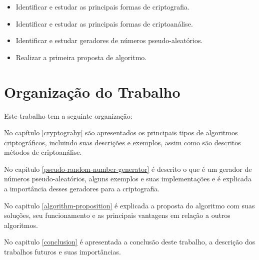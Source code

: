 \begin{itemize}
	\item Identificar e estudar as principais formas de criptografia.
	\item Identificar e estudar as principais formas de criptoanálise.
	\item Identificar e estudar geradores de números pseudo-aleatórios.
	\item Realizar a primeira proposta de algoritmo.
\end{itemize}

\section{Organização do Trabalho}
\label{paper-organization}

Este trabalho tem a seguinte organização:

No capítulo \ref{cryptograhy} são apresentados os principais tipos de algoritmos criptográficos, incluindo suas descrições e exemplos, assim como são descritos métodos de criptoanálise.

No capitulo \ref{pseudo-random-number-generator} é descrito o que é um gerador de números pseudo-aleatórios, alguns exemplos e suas implementações e é explicada a importância desses geradores para a criptografia. 

No capitulo \ref{algorithm-proposition} é explicada a proposta do algoritmo com suas soluções, seu funcionamento e as principais vantagens em relação a outros algoritmos.

No capitulo \ref{conclusion} é apresentada a conclusão deste trabalho, a descrição dos trabalhos futuros e suas importâncias.
